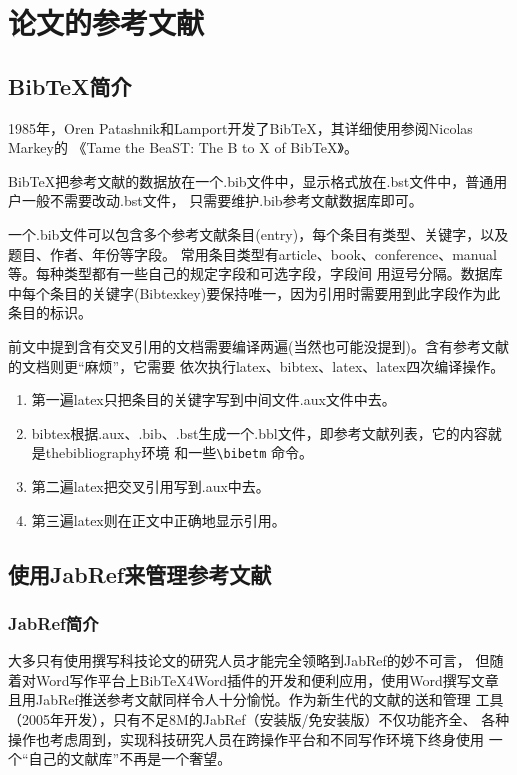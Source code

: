 \chapter{论文的参考文献}
\label{chapter6-reference}
\section{BibTeX简介}
\label{section-bibtex}
1985年，Oren Patashnik和Lamport开发了BibTeX，其详细使用参阅Nicolas Markey的
《Tame the BeaST: The B to X of BibTeX》。

BibTeX把参考文献的数据放在一个.bib文件中，显示格式放在.bst文件中，普通用户一般不需要改动.bst文件，
只需要维护.bib参考文献数据库即可。

一个.bib文件可以包含多个参考文献条目(entry)，每个条目有类型、关键字，以及题目、作者、年份等字段。
常用条目类型有article、book、conference、manual等。每种类型都有一些自己的规定字段和可选字段，字段间
用逗号分隔。数据库中每个条目的关键字(Bibtexkey)要保持唯一，因为引用时需要用到此字段作为此条目的标识。

前文中提到含有交叉引用的文档需要编译两遍(当然也可能没提到)。含有参考文献的文档则更“麻烦”，它需要
依次执行latex、bibtex、latex、latex四次编译操作。
\begin{enumerate}
\item 第一遍latex只把条目的关键字写到中间文件.aux文件中去。
\item bibtex根据.aux、.bib、.bst生成一个.bbl文件，即参考文献列表，它的内容就是thebibliography环境
和一些\verb|\bibetm| 命令。
\item 第二遍latex把交叉引用写到.aux中去。
\item 第三遍latex则在正文中正确地显示引用。
\end{enumerate}

\section{使用JabRef来管理参考文献}
\subsection{JabRef简介}
大多只有使用\latex{}撰写科技论文的研究人员才能完全领略到JabRef的妙不可言，
但随着对Word写作平台上BibTeX4Word插件的开发和便利应用，使用Word撰写文章
且用JabRef推送参考文献同样令人十分愉悦。作为新生代的文献的送和管理
工具（2005年开发），只有不足8M的JabRef（安装版/免安装版）不仅功能齐全、
各种操作也考虑周到，实现科技研究人员在跨操作平台和不同写作环境下终身使用
一个“自己的文献库”不再是一个奢望。


